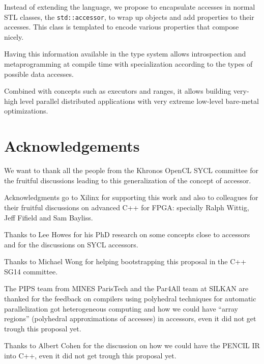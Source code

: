 \documentclass[a4paper]{article}
\begin{document}
Instead of extending the language, we propose to encapsulate accesses
in normal STL classes, the \lstinline|std::accessor|, to wrap up
objects and add properties to their accesses. This class is templated
to encode various properties that compose nicely.

Having this information available in the type system allows
introspection and metaprogramming at compile time with specialization
according to the types of possible data accesses.

Combined with concepts such as executors and ranges, it allows
building very-high level parallel distributed applications with very
extreme low-level bare-metal optimizations.


\section*{Acknowledgements}
\label{sec:acknowledgements}

We want to thank all the people from the Khronos OpenCL SYCL committee
for the fruitful discussions leading to this generalization of the
concept of accessor.

Acknowledgments go to Xilinx for supporting this work and also to
colleagues for their fruitful discussions on advanced C++ for FPGA:
specially Ralph Wittig, Jeff Fifield and Sam Bayliss.

Thanks to Lee Howes for his PhD \cite{PhD:Howes2010} research on some
concepts close to accessors and for the discussions on SYCL accessors.

Thanks to Michael Wong for helping bootstrapping this proposal in the
C++ SG14 committee.

The PIPS team from MINES ParisTech and the Par4All team at SILKAN are
thanked for the feedback on compilers using polyhedral techniques for
automatic parallelization got heterogeneous computing and how we could
have ``array regions'' (polyhedral approximations of accesses) in
accessors, even it did not get trough this proposal yet.

Thanks to Albert Cohen for the discussion on how we could have the
PENCIL IR \cite{PENCIL} into C++, even it did not get trough this
proposal yet.




\end{document}
